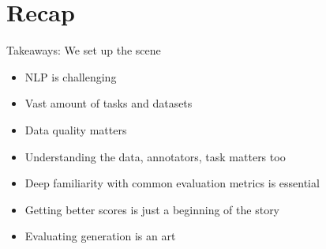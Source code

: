 \documentclass[12pt,aspectratio=169,handout]{beamer}
\begin{document}
%
%
%
%
%
%
%
%
%
%
%


\section*{Recap}

\begin{frame}{Takeaways: We set up the scene}
	
\begin{itemize}
	\item NLP is challenging
	\item Vast amount of tasks and datasets
	\item Data quality matters
	\item Understanding the data, annotators, task matters too
	\item Deep familiarity with common evaluation metrics is essential
	\item Getting better scores is just a beginning of the story
	\item Evaluating generation is an art
\end{itemize}
	
\end{frame}
\end{document}
